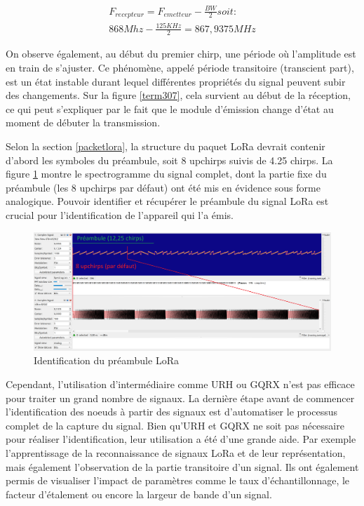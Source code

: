 \begin{align}
    F_{recepteur} = F_{emetteur} - \frac{BW}{2} soit: \\
    868Mhz - \frac{125KHz}{2} = 867,9375MHz
\end{align}

On observe également, au début du premier chirp, une période où l'amplitude est en train de s'ajuster. Ce phénomène, appelé période transitoire (transcient part), est un état instable durant lequel différentes propriétés du signal peuvent subir des changements. Sur la figure \ref{term307}, cela survient au début de la réception, ce qui peut s'expliquer par le fait que le module d'émission change d'état au moment de débuter la transmission.

\vspace{0.1cm}

Selon la section \ref{packetlora}, la structure du paquet \ac{LoRa} devrait contenir d'abord les symboles du préambule, soit 8 upchirps suivis de 4.25 chirps. La figure \ref{term308} montre le spectrogramme du signal complet, dont la partie fixe du préambule (les 8 upchirps par défaut) ont été mis en évidence sous forme analogique. Pouvoir identifier et récupérer le préambule du signal \ac{LoRa} est crucial pour l'identification de l'appareil qui l'a émis.


\begin{figure}[h]
\centering

\includegraphics[scale=0.18]{images/urh6.png}
\caption{Identification du préambule LoRa}\label{term308}
\end{figure}

Cependant, l'utilisation d'intermédiaire comme \ac{URH} ou GQRX n'est pas efficace pour traiter un grand nombre de signaux. La dernière étape avant de commencer l'identification des noeuds à partir des signaux est d'automatiser le processus complet de la capture du signal. Bien qu'\ac{URH} et GQRX ne soit pas nécessaire pour réaliser l'identification, leur utilisation a été d'une grande aide. Par exemple l'apprentissage de la reconnaissance de signaux \ac{LoRa} et de leur représentation, mais également l'observation de la partie transitoire d'un signal. Ils ont également permis de visualiser l'impact de paramètres comme le taux d'échantillonnage, le facteur d'étalement ou encore la largeur de bande d'un signal.

